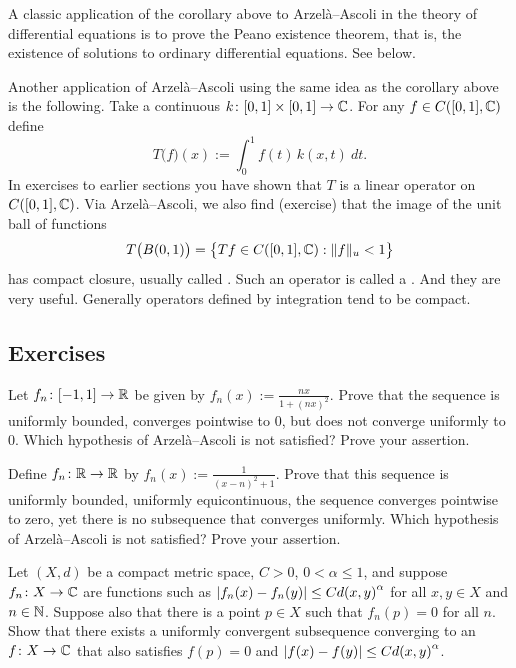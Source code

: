 A classic application of the corollary above to Arzel\`a--Ascoli
in the theory of differential
equations is to prove the Peano existence
theorem, that is, the existence of solutions to ordinary differential
equations.  See  below.

\medskip

Another application of Arzel\`a--Ascoli using the same idea as the
corollary above is the following.
Take a continuous $k \colon [0,1] \times [0,1] \to {\mathbb{C}}$.
For any $f \in C([0,1],{\mathbb{C}})$ define
\begin{equation*}
T\bigl(f\bigr)(x) :=  \int_0^1 f(t) \, k(x,t)~dt .
\end{equation*}
In exercises to earlier sections you have shown that 
$T$ is a linear operator on $C([0,1],{\mathbb{C}})$.
Via Arzel\`a--Ascoli, we also find (exercise) that
the image of the unit ball of functions
\begin{equation*}
T\bigl( B(0,1) \bigr) = 
\bigl\{
Tf \in C([0,1],{\mathbb{C}}) :  
\lVert {f} \rVert_u < 1
\bigr\}
\end{equation*}
has compact closure, usually called
\emph{}.
Such an operator is called a \emph{}.
And they are very useful.  Generally operators defined by
integration tend to be compact.

\subsection{Exercises}

\begin{exercise}
Let $f_n \colon [-1,1] \to {\mathbb{R}}$ be given by $f_n(x) := \frac{nx}{1+{(nx)}^2}$.
Prove that the sequence is uniformly bounded, converges pointwise to 0, but
does not converge uniformly to 0.
Which hypothesis of Arzel\`a--Ascoli
is not satisfied?  Prove your assertion.
\end{exercise}

\begin{exercise}
Define $f_n \colon {\mathbb{R}} \to {\mathbb{R}}$ by $f_n(x) := \frac{1}{{(x-n)}^2+1}$.  Prove that
this sequence is uniformly bounded, uniformly equicontinuous, the sequence
converges pointwise to zero, yet there is no
subsequence that converges uniformly.
Which hypothesis of Arzel\`a--Ascoli
is not satisfied?  Prove your assertion.
\end{exercise}

\begin{exercise}
Let $(X,d)$ be a compact metric space, $C > 0$, $0 < \alpha \leq 1$, and
suppose $f_n \colon X \to {\mathbb{C}}$ are functions such as
$\left\lvert {f_n(x)-f_n(y)} \right\rvert \leq C {d(x,y)}^\alpha$ for all $x,y \in X$ and
$n \in {\mathbb{N}}$.  Suppose also that there is a point $p \in X$ such that
$f_n(p) = 0$ for all $n$.
Show that there exists a uniformly convergent subsequence converging to
an $f \colon X \to {\mathbb{C}}$ that also satisfies $f(p) = 0$ and
$\left\lvert {f(x)-f(y)} \right\rvert \leq C {d(x,y)}^\alpha$.
\end{exercise}

